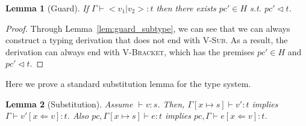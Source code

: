 \documentclass[a4paper,twocolumn]{article}
\newcommand{\typeRule}[3]{#1 \vdash #2 \colon #3}
\newcommand{\guards}[0]{\lhd}
\theoremstyle{plain}
\newtheorem{lemma}{Lemma}
\theoremstyle{definition}
\begin{document}
\begin{lemma}[Guard]
  \label{lem:guard}
  If $\typeRule{\Gamma}{< v_1 | v_2 >}{t}$ then there exists $pc' \in H$ s.t.
  $pc' \guards t$.
\end{lemma}
\begin{proof}
  Through Lemma~\ref{lem:guard_subtype}, we can see that we can always construct
  a typing derivation that does not end with \textsc{V-Sub}.  As a result, the
  derivation can always end with \textsc{V-Bracket}, which has the premises $pc'
  \in H$ and $pc' \guards t$.
\end{proof}

Here we prove a standard substitution lemma for the type system.

\begin{lemma}[Substitution]
  \label{lem:substitution}
  Assume $\typeRule{ }{v}{s}$.  Then, $\typeRule{\Gamma[x \mapsto s]}{v'}{t}$
  implies $\typeRule{\Gamma}{v'[x \Leftarrow v]}{t}$.  Also $\typeRule{pc,
  \Gamma[x \mapsto s]}{e}{t}$ implies $\typeRule{pc, \Gamma}{e[x \Leftarrow
  v]}{t}$.
\end{lemma}
\end{document}
